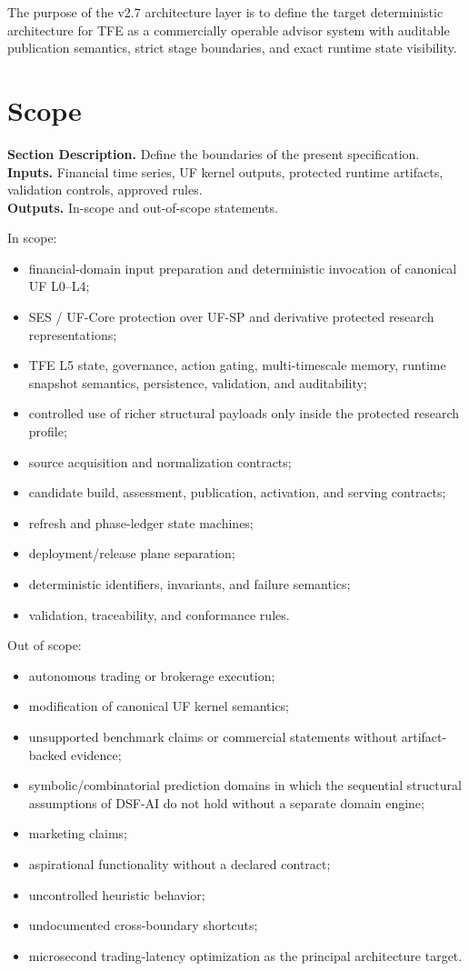 \documentclass[11pt]{report}
\newcommand{\meta}[3]{\textbf{Section Description.} #1\\
\textbf{Inputs.} #2\\
\textbf{Outputs.} #3\par}
\begin{document}
The purpose of the v2.7 architecture layer is to define the target deterministic architecture for TFE as a commercially operable advisor system with auditable publication semantics, strict stage boundaries, and exact runtime state visibility.

\section{Scope}
\meta{Define the boundaries of the present specification.}{Financial time series, UF kernel outputs, protected runtime artifacts, validation controls, approved rules.}{In-scope and out-of-scope statements.}

In scope:
\begin{itemize}
    \item financial-domain input preparation and deterministic invocation of canonical UF L0--L4;
    \item SES / UF-Core protection over UF-SP and derivative protected research representations;
    \item TFE L5 state, governance, action gating, multi-timescale memory, runtime snapshot semantics, persistence, validation, and auditability;
    \item controlled use of richer structural payloads only inside the protected research profile;
    \item source acquisition and normalization contracts;
    \item candidate build, assessment, publication, activation, and serving contracts;
    \item refresh and phase-ledger state machines;
    \item deployment/release plane separation;
    \item deterministic identifiers, invariants, and failure semantics;
    \item validation, traceability, and conformance rules.
\end{itemize}

Out of scope:
\begin{itemize}
    \item autonomous trading or brokerage execution;
    \item modification of canonical UF kernel semantics;
    \item unsupported benchmark claims or commercial statements without artifact-backed evidence;
    \item symbolic/combinatorial prediction domains in which the sequential structural assumptions of DSF-AI do not hold without a separate domain engine;
    \item marketing claims;
    \item aspirational functionality without a declared contract;
    \item uncontrolled heuristic behavior;
    \item undocumented cross-boundary shortcuts;
    \item microsecond trading-latency optimization as the principal architecture target.
\end{itemize}
\end{document}
